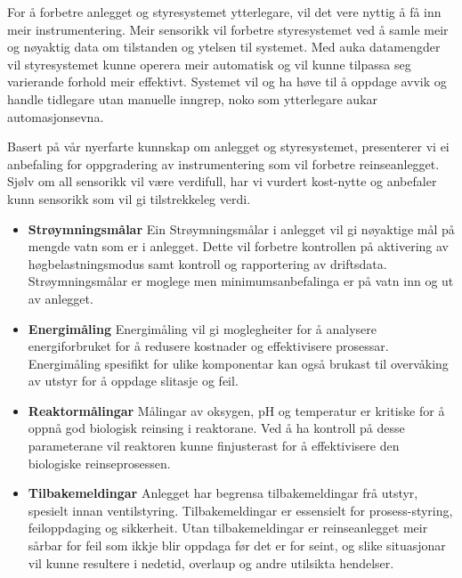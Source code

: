 For å forbetre anlegget og styresystemet ytterlegare, vil det vere nyttig å få inn meir instrumentering. 
Meir sensorikk vil forbetre styresystemet ved å samle meir og nøyaktig data om tilstanden og ytelsen til systemet. 
Med auka datamengder vil styresystemet kunne operera meir automatisk og vil kunne tilpassa seg varierande forhold meir effektivt. 
Systemet vil og ha høve til å oppdage avvik og handle tidlegare utan manuelle inngrep, noko som ytterlegare aukar automasjonsevna.

Basert på vår nyerfarte kunnskap om anlegget og styresystemet, presenterer vi ei
anbefaling for oppgradering av instrumentering som vil forbetre reinseanlegget. 
Sjølv om all sensorikk vil være verdifull, har vi vurdert kost-nytte og anbefaler kunn sensorikk som vil gi tilstrekkeleg verdi.


\begin{itemize}
    \item \textbf{Strøymningsmålar} \newline
        Ein Strøymningsmålar i anlegget vil gi nøyaktige mål på mengde vatn som er i anlegget.
        Dette vil forbetre kontrollen på aktivering av høgbelastningsmodus samt kontroll og rapportering av driftsdata.
        Strøymningsmålar er moglege men minimumsanbefalinga er på vatn inn og ut av anlegget.
    \item \textbf{Energimåling} \newline
        Energimåling vil gi moglegheiter for å analysere energiforbruket for å redusere kostnader og effektivisere prosessar.
        Energimåling spesifikt for ulike komponentar kan også brukast til overvåking av utstyr for å oppdage slitasje og feil.
    \item \textbf{Reaktormålingar} \newline
        Målingar av oksygen, pH og temperatur er kritiske for å oppnå god biologisk reinsing i reaktorane.\newline
        Ved å ha kontroll på desse parameterane vil reaktoren kunne finjusterast for å effektivisere den biologiske reinseprosessen.
    \item \textbf{Tilbakemeldingar} \newline
        Anlegget har begrensa tilbakemeldingar frå utstyr, spesielt innan ventilstyring.
        Tilbakemeldingar er essensielt for prosess-styring, feiloppdaging og sikkerheit.
        Utan tilbakemeldingar er reinseanlegget meir sårbar for feil som ikkje blir oppdaga før det er for seint, 
        og slike situasjonar vil kunne resultere i nedetid, overlaup og andre utilsikta hendelser.

\end{itemize}
